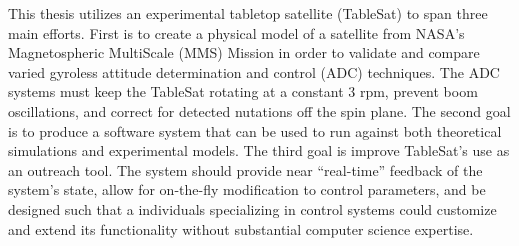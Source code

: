 
\begin{abstractpage}
This thesis utilizes an experimental tabletop satellite (TableSat) to span three main efforts.  First is to create a physical model of a satellite from NASA's Magnetospheric MultiScale (MMS) Mission in order to validate and compare varied gyroless attitude determination and control (ADC) techniques.  The ADC systems must keep the TableSat rotating at a constant 3 rpm, prevent boom oscillations, and correct for detected nutations off the spin plane.  The second goal is to produce a software system that can be used to run against both theoretical simulations and experimental models.  The third goal is improve TableSat's use as an outreach tool.  The system should provide near ``real-time'' feedback of the system's state, allow for on-the-fly modification to control parameters, and be designed such that a individuals specializing in control systems could customize and extend its functionality without substantial computer science expertise.
\end{abstractpage}
